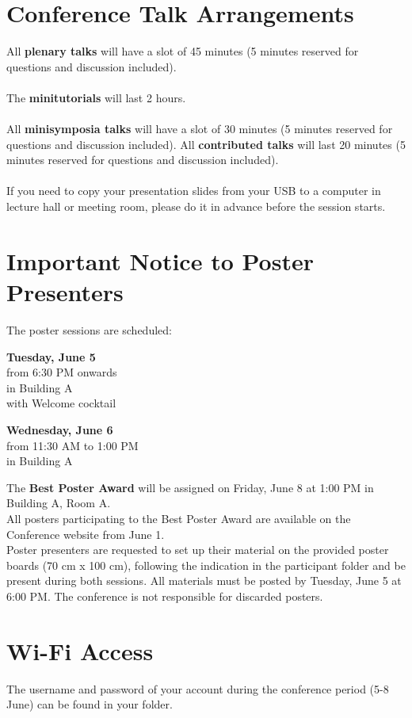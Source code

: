 \section*{Conference Talk Arrangements}
  All \textbf{plenary talks} will have a slot of 45 minutes
  (5 minutes reserved for questions and discussion included).\\\\
  The \textbf{minitutorials} will last 2 hours.\\\\
  All \textbf{minisymposia talks} will have a slot of 30 minutes (5 minutes reserved for questions and discussion included).
  All \textbf{contributed talks} will last 20 minutes (5 minutes reserved for questions and discussion included).\\\\
  If you need to copy your presentation slides from your USB to a computer in lecture hall or meeting room, please do it in advance before
  the session starts.
\section*{Important Notice to Poster Presenters}
The poster sessions are scheduled:
  \begin{center}
    \textbf{Tuesday, June 5} \\
    from 6:30 PM onwards \\
    in Building A\\
    with Welcome cocktail

    \bigskip
   
    \textbf{Wednesday, June 6} \\
    from 11:30 AM to 1:00 PM \\
    in Building A
  \end{center}

\noindent The \textbf{Best Poster Award} will be assigned on Friday, June 8 at 1:00 PM in Building A, Room A.\\
All posters participating to the Best Poster Award are available on the Conference website from June 1.\\
Poster presenters are requested to set up
their material on the provided poster boards (70 cm x 100 cm), following the indication in the participant folder and be present during both sessions.  
All materials must
be posted by Tuesday, June 5 at
6:00 PM.
The conference is not responsible for
discarded posters.
\section*{Wi-Fi Access}
The username and password of your account during the conference period (5-8 June) can be found in your folder.
